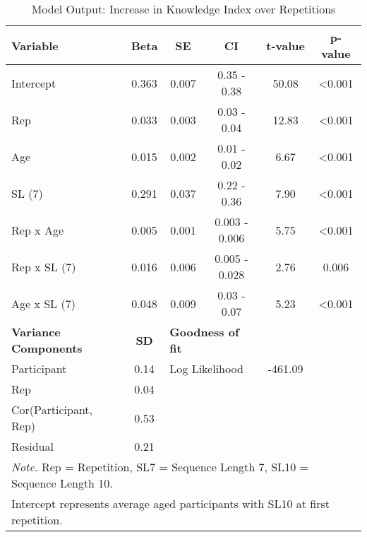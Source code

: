 \begin{table}[H]
\centering
\begin{tabular}{lccccc}
\hline
\textbf{Variable}            & \textbf{Beta} & \textbf{SE}          & \textbf{CI}           & \textbf{t-value} & \textbf{p-value} \\ \hline
Intercept                    & 0.363         & 0.007                & 0.35 - 0.38           & 50.08            & \textless{}0.001 \\
Rep                          & 0.033         & 0.003                & 0.03 - 0.04           & 12.83            & \textless{}0.001 \\
Age                          & 0.015         & 0.002                & 0.01 - 0.02           & 6.67             & \textless{}0.001 \\
SL (7)                       & 0.291         & 0.037                & 0.22 - 0.36           & 7.90             & \textless{}0.001 \\
Rep x Age                    & 0.005         & 0.001                & 0.003 - 0.006         & 5.75             & \textless{}0.001 \\
Rep x SL (7)                 & 0.016         & 0.006                & 0.005 - 0.028         & 2.76             & 0.006            \\
Age x SL (7)                 & 0.048         & 0.009                & 0.03 - 0.07           & 5.23             & \textless{}0.001 \\ \hline
\textbf{Variance Components} & \textbf{SD}   & \multicolumn{2}{l}{\textbf{Goodness of fit}} & \textbf{}        & \textbf{}        \\ \hline
Participant                  & 0.14          & \multicolumn{2}{l}{Log Likelihood}           & -461.09          &                  \\
Rep                          & 0.04          &                      &                       &                  &                  \\
Cor(Participant, Rep)        & 0.53          &                      &                       &                  &                  \\
Residual                     & 0.21          &                      &                       &                  &                  \\ \hline
\multicolumn{6}{l}{\small \textit{Note.} Rep = Repetition, SL7 = Sequence Length 7, SL10 = Sequence Length 10.}\\[-0.3cm]
\multicolumn{6}{l}{\small Intercept represents average aged participants with SL10 at first repetition.}\\
\end{tabular}
\caption{Model Output: Increase in Knowledge Index over Repetitions}
\label{tab:ReKI}
\end{table}

